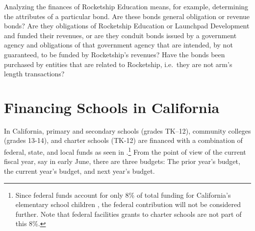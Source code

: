 Analyzing the finances of Rocketship Education means, for example, determining the attributes of a particular bond. Are these bonds general obligation or revenue bonds? Are they obligations of Rocketship Education or Launchpad Development and funded their revenues, or are they conduit bonds issued by a government agency and obligations of that government agency that are intended, by not guaranteed, to be funded by Rocketship's revenues? Have the bonds been purchased by entities that are related to Rocketship, i.e.~they are not arm's length transactions?

\section{Financing Schools in California}\label{sec:financing-ca-overview}\indent

In California, primary and secondary schools (grades TK–12), community colleges (grades 13-14), and charter schools (TK-12) are financed with a combination of federal, state, and local funds as seen in .\footnote{Since federal funds account for only 8\% of total funding for California's elementary school children \parencite{LAO2021}, the federal contribution will not be considered further. Note that federal facilities grants to charter schools are not part of this 8\%.} From the point of view of the current fiscal year, say in early June, there are three budgets: The prior year's budget, the current year's budget, and next year's budget.


